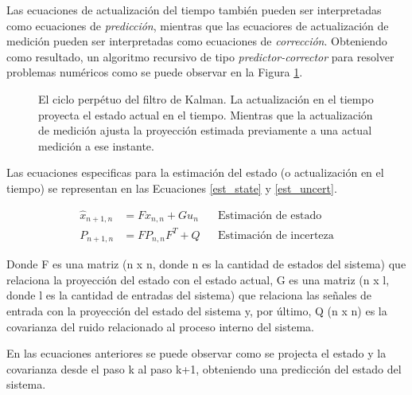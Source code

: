 \documentclass[10pt,a4paper]{article}
\begin{document}
\noindent Las ecuaciones de actualizaci\'on del tiempo tambi\'en pueden ser 
interpretadas como ecuaciones de \emph{predicci\'on}, mientras que las 
ecuaciores de actualizaci\'on de medici\'on pueden ser interpretadas como 
ecuaciones de \emph{correcci\'on}. Obteniendo como resultado, un algoritmo 
recursivo de tipo \emph{predictor-corrector} para resolver problemas num\'ericos 
como se puede observar en la Figura \ref{kalman_filter_sch}.

\begin{figure}[h!]
    \begin{center}
    \caption{El ciclo perp\'etuo del filtro de Kalman. La actualizaci\'on en el
    tiempo proyecta el estado actual en el tiempo. Mientras que la 
    actualizaci\'on de medici\'on ajusta la proyecci\'on estimada previamente a
    una actual medici\'on a ese instante.}
    \label{kalman_filter_sch}
    \end{center}
\end{figure}

Las ecuaciones especificas para la estimaci\'on del estado (o actualizaci\'on
en el tiempo) se representan en las Ecuaciones \ref{est_state} y 
\ref{est_uncert}.

\begin{align}
    \hat{x}_{n+1, n} &= F\hat{x}_{n,n} + Gu_n & & \textrm{Estimaci\'on de estado}
    \label{est_state} \\
    P_{n+1,n} &= FP_{n,n}F^T + Q & & \textrm{Estimaci\'on de incerteza}
    \label{est_uncert}
\end{align}

\noindent Donde F es una matriz (n x n, donde n es la cantidad de estados del 
sistema) que relaciona la proyecci\'on del estado con el estado actual, G es una 
matriz (n x l, donde l es la cantidad de entradas del sistema) que relaciona las 
señales de entrada con la proyecci\'on del estado del sistema y, por \'ultimo, 
Q (n x n) es la covarianza del ruido relacionado al proceso interno del sistema.

\noindent En las ecuaciones anteriores se puede observar como se projecta el 
estado y la covarianza desde el paso k al paso k+1, obteniendo una predicci\'on 
del estado del sistema.
\end{document}
